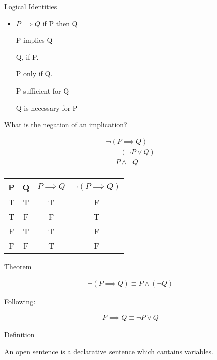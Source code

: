 \documentclass{report}
\begin{document}
\begin{description}
    \item Logical Identities 

        \begin{itemize}
            \item $P \implies Q$
                if P then Q

                P implies Q

                Q, if P.

                P only if Q.

                P sufficient for Q

                Q is necessary for P
        \end{itemize}
    
    \item What is the negation of an implication?
        
        \begin{gather}
            \neg (P \implies Q) \\ 
            = \neg (\neg P \lor Q)\\
            = P \land \neg Q\\
        \end{gather}

        \begin{tabular}{|c|c|c|c|}
            \hline
            P & Q & $P \implies Q$ & $\neg(P\implies Q)$\\
            \hline
            T & T & T & F\\
            \hline
            T & F & F & T\\
            \hline
            F & T & T & F\\
            \hline
            F & F & T & F\\
            \hline
        \end{tabular}

    \item Theorem

        \begin{gather}
           \neg (P \implies Q) \equiv P \land (\neg Q) 
        \end{gather}

        Following:

        \begin{gather}
           P \implies Q \equiv \neg P \lor Q 
        \end{gather}

        \pagebreak
    \item Definition
        \begin{mdframed}
            An open sentence is a declarative sentence
            which cantains variables.


\end{mdframed}
\end{description}
\end{document}
